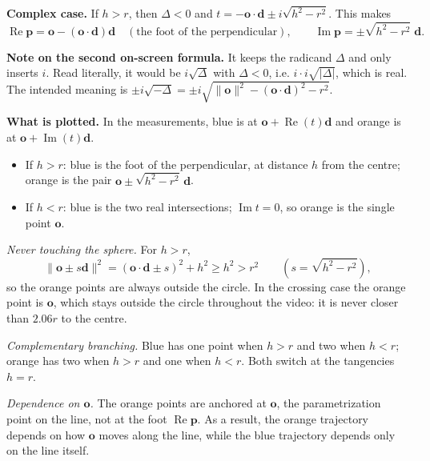\documentclass[10pt,a4paper]{article}
\newcommand{\vo}{\mathbf{o}}\newcommand{\vd}{\mathbf{d}}\newcommand{\vp}{\mathbf{p}}
\begin{document}
\textbf{Complex case.} If $h>r$, then $\Delta<0$ and $t=-\vo\cdot\vd\pm i\sqrt{h^2-r^2}$. This makes
\[
\operatorname{Re}\vp=\vo-(\vo\cdot\vd)\vd \quad(\text{the foot of the perpendicular}),\qquad
\operatorname{Im}\vp=\pm\sqrt{h^2-r^2}\;\vd .
\]

\textbf{Note on the second on-screen formula.} It keeps the radicand $\Delta$ and only inserts $i$. Read literally, it would be $i\sqrt{\Delta}$ with $\Delta<0$, i.e. $i\cdot i\sqrt{|\Delta|}$, which is real. The intended meaning is $\pm i\sqrt{-\Delta}=\pm i\sqrt{\lVert\vo\rVert^2-(\vo\cdot\vd)^2-r^2}$.

\textbf{What is plotted.} In the measurements, blue is at $\vo+\operatorname{Re}(t)\vd$ and orange is at $\vo+\operatorname{Im}(t)\vd$.
\begin{itemize}
\item If $h>r$: blue is the foot of the perpendicular, at distance $h$ from the centre; orange is the pair $\vo\pm\sqrt{h^2-r^2}\,\vd$.
\item If $h<r$: blue is the two real intersections; $\operatorname{Im}t=0$, so orange is the single point $\vo$.
\end{itemize}
\emph{Never touching the sphere.} For $h>r$,
\[
\lVert\vo\pm s\vd\rVert^2=(\vo\cdot\vd\pm s)^2+h^2\ge h^2>r^2 \qquad (s=\sqrt{h^2-r^2}),
\]
so the orange points are always outside the circle. In the crossing case the orange point is $\vo$, which stays outside the circle throughout the video: it is never closer than $2.06r$ to the centre.

\emph{Complementary branching.} Blue has one point when $h>r$ and two when $h<r$; orange has two when $h>r$ and one when $h<r$. Both switch at the tangencies $h=r$.

\emph{Dependence on $\vo$.} The orange points are anchored at $\vo$, the parametrization point on the line, not at the foot $\operatorname{Re}\vp$. As a result, the orange trajectory depends on how $\vo$ moves along the line, while the blue trajectory depends only on the line itself.
\end{document}
